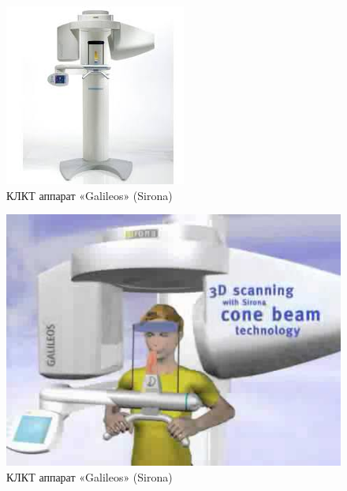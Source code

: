 \documentclass[11pt]{article}
\begin{document}
	\begin{figure}[H]
	\centering
	\includegraphics[width=\textwidth]{klkt3}
	\caption{ КЛКТ аппарат «Galileos» (Sirona) ~\cite{rejr} }
	\label{fig:klkt3}
	\end{figure} 

	\begin{figure}[H]
	\centering
	\includegraphics[width=\textwidth]{klkt4}
	\caption{ КЛКТ аппарат «Galileos» (Sirona) ~\cite{rejr} }
	\label{fig:klkt3}
	\end{figure} 
	
\end{document}
